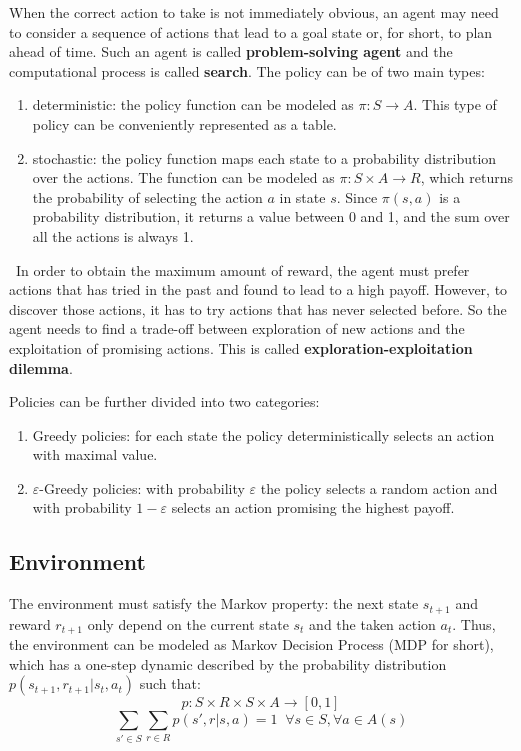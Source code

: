 \documentclass{article}
\begin{document}
When the correct action to take is not immediately obvious, an agent may need to consider a sequence of actions that lead to a goal state or, for short, to plan ahead of time. Such an agent is called \textbf{problem-solving agent} and the computational process is called \textbf{search}. The policy can be of two main types:
\begin{enumerate}
    \item deterministic: the policy function can be modeled as \(\pi: S \to A\). This type of policy can be conveniently represented as a table.
    \item stochastic: the policy function maps each state to a probability distribution over the actions. The function can be modeled as \(\pi: S\times A\to R\), which returns the probability of selecting the action \(a\) in state \(s\). Since \(\pi(s, a)\) is a probability distribution, it returns a value between 0 and 1, and the sum over all the actions is always 1.
\end{enumerate}

\
In order to obtain the maximum amount of reward, the agent must prefer actions that has tried in the past and found to lead to a high payoff. However, to discover those actions, it has to try actions that has never selected before. So the agent needs to find a trade-off between exploration of new actions and the exploitation of promising actions. This is called \textbf{exploration-exploitation dilemma}. 

Policies can be further divided into two categories:
\begin{enumerate}
    \item Greedy policies: for each state the policy deterministically selects an action with maximal value.
    \item \(\varepsilon\)-Greedy policies: with probability \(\varepsilon\) the policy selects a random action and with probability \(1-\varepsilon\) selects an action promising the highest payoff.
\end{enumerate}

\subsection{Environment}
The environment must satisfy the Markov property: the next state \(s_{t+1}\) and reward \(r_{t+1}\) only depend on the current state \(s_t\) and the taken action \(a_t\). Thus, the environment can be modeled as Markov Decision Process (MDP for short), which has a one-step dynamic described by the probability distribution \(p(s_{t+1}, r_{t+1}|s_t, a_t)\) such that:
\[p:S \times R \times S \times A \to [0, 1]\]
\[\sum_{s'\in S}\sum_{r\in R} p(s', r| s, a) = 1 \;\; \forall s \in S, \forall a \in A(s)\]
\end{document}
